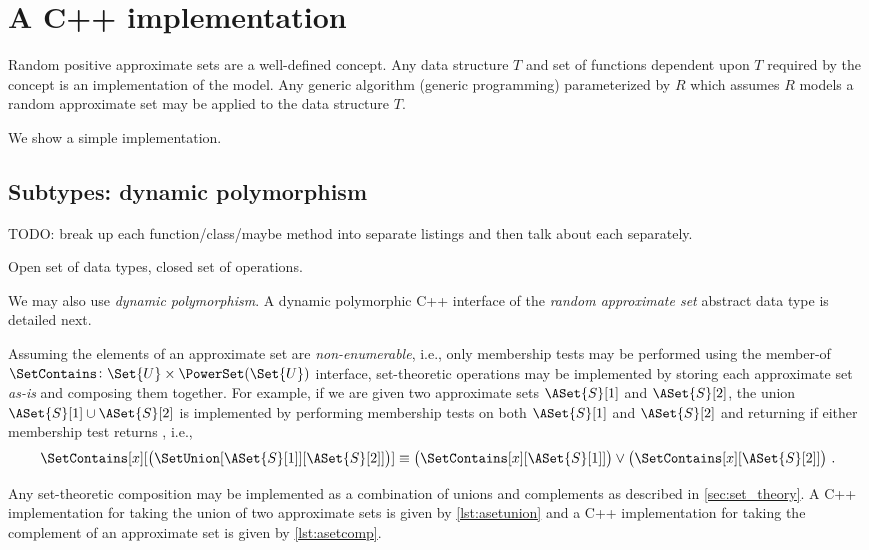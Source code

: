 \documentclass[ ../main.tex]{subfiles}
\begin{document}
\section{A C++ implementation}
\label{sec:impl}
Random positive approximate sets are a well-defined concept. Any data structure $T$ and set of functions dependent upon $T$ required by the concept is an implementation of the model.
Any generic algorithm (generic programming) parameterized by $R$ which assumes $R$ models a random approximate set may be applied to the data structure $T$.

We show a simple implementation.

\subsection{Subtypes: dynamic polymorphism}
TODO: break up each function/class/maybe method into separate listings and then
talk about each separately.

Open set of data types, closed set of operations.

We may also use \emph{dynamic polymorphism}. A dynamic polymorphic C++ 
interface of the \emph{random approximate set} abstract data type is detailed next.


Assuming the elements of an approximate set are \emph{non-enumerable}, i.e., only membership tests may be performed using the member-of $\SetContains \colon \Set{U} \times \PowerSet(\Set{U})$ interface, set-theoretic operations may be implemented by storing each approximate set \emph{as-is} and composing them together. For example, if we are given two approximate sets $\ASet{S}[1]$ and $\ASet{S}[2]$, the union $\ASet{S}[1] \cup \ASet{S}[2]$ is implemented by performing membership tests on both $\ASet{S}[1]$ and $\ASet{S}[2]$ and returning \True if either membership test returns \True, i.e.,
\begin{equation}
\SetContains[x][\left(\SetUnion[\ASet{S}[1]][\ASet{S}[2]]\right)] \equiv \left(\SetContains[x][\ASet{S}[1]]\right) \lor \left(\SetContains[x][\ASet{S}[2]]\right)\,.
\end{equation}

Any set-theoretic composition may be implemented as a combination of unions and complements as described in \cref{sec:set_theory}. A C++ implementation for taking the union of two approximate sets is given by \cref{lst:asetunion} and a C++ implementation for taking the complement of an approximate set is given by \cref{lst:asetcomp}.
\end{document}
